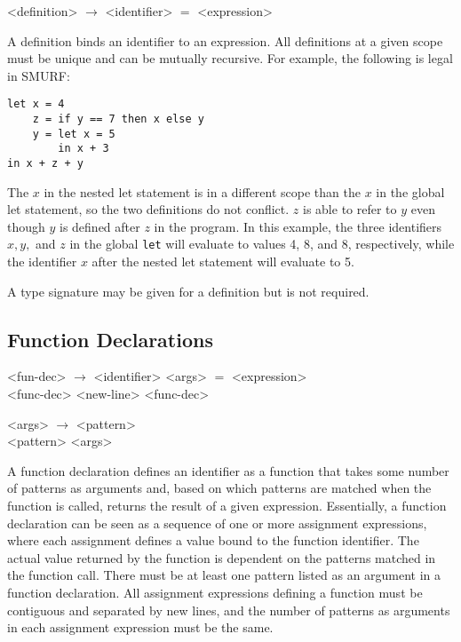 \begin{grammar}

<definition> $\rightarrow$ <identifier> $=$ <expression>

\end{grammar}

A definition binds an identifier to an expression. All definitions at a given
scope must be unique and can be mutually recursive. For example, the following
is legal in SMURF:

\begin{verbatim}
let x = 4
  	z = if y == 7 then x else y
  	y = let x = 5 
        in x + 3 
in x + z + y
\end{verbatim}


The $x$ in the nested let statement is in a different scope than the $x$ in the global let statement, 
so the two definitions do not conflict. $z$ is able to refer to $y$ even though
$y$ is defined after $z$ in the program. In this example, the three 
identifiers $x, y, $ and $z$ in the global \texttt{let} will evaluate to values 4, 8, and 8, respectively,
while the identifier $x$ after the nested let statement will evaluate to 5.

A type signature may be given for a definition but is not required.

\subsection{Function Declarations}

\begin{grammar}

<fun-dec> $\rightarrow$ <identifier> <args> $=$ <expression> \\
												 <func-dec> <new-line> <func-dec>

<args> $\rightarrow$ <pattern> \\ <pattern> <args>
\end{grammar}

A function declaration defines an identifier as a function that takes
some number of patterns as arguments and, based on which patterns are matched
when the function is called, returns the result
of a given expression. Essentially, a function declaration can be seen as a 
sequence of one or more assignment expressions, where each assignment defines
a value bound to the function identifier. The actual value returned by the function
is dependent on the patterns matched in the function call. There must be at least one pattern listed
as an argument in a function declaration. All assignment expressions defining
a function must be contiguous and separated by new lines, and the number of
patterns as arguments in each assignment expression must be the same.

